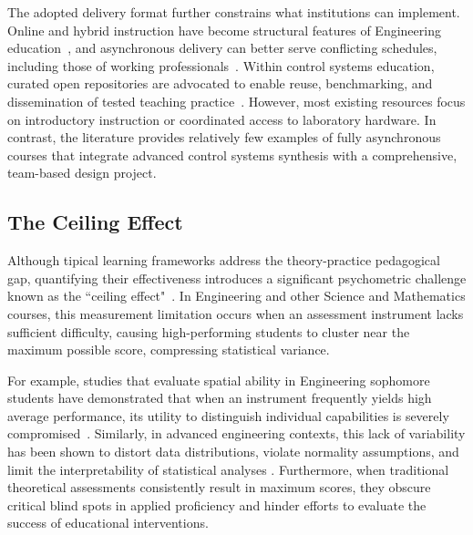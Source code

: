 \documentclass[journal]{IEEEtran}
\begin{document}
The adopted delivery format further constrains what institutions can implement. Online and hybrid instruction have become structural features of Engineering education~\cite{chaconvasquez2024digitalControlEducation,quanser2021yorkhybridlab,quanser2022calgaryhybridlearning,quanser2022bitpblcontrols,mohammadi2025stralsundhybridlabs,mohammadi2025epflremotelabs}, and asynchronous delivery can better serve conflicting schedules, including those of working professionals~\cite{buiu2008,chaconvasquez2024digitalControlEducation}. Within control systems education, curated open repositories are advocated to enable reuse, benchmarking, and dissemination of tested teaching practice~\cite{serbezov2022openAccessResourcesFeedbackDynamicsControl}. However, most existing resources focus on introductory instruction or coordinated access to laboratory hardware. In contrast, the literature provides relatively few examples of fully asynchronous courses that integrate advanced control systems synthesis with a comprehensive, team-based design project.

\subsection{The Ceiling Effect}

Although tipical learning frameworks address the  theory-practice pedagogical gap, quantifying their effectiveness introduces a significant psychometric challenge known as the ``ceiling effect"~\cite{Wang2009, Uttl2005, edwards2024, gilbert2025, Call2016, Bahnson2023, Staus2021}. In Engineering and other Science and Mathematics courses, this measurement limitation occurs when an assessment instrument lacks sufficient difficulty, causing high-performing students to cluster near the maximum possible score, compressing statistical variance. 

For example, studies that evaluate spatial ability in Engineering sophomore students have demonstrated that when an instrument frequently yields high average performance, its utility to distinguish individual capabilities is severely compromised~\cite{Call2016}. Similarly, in advanced engineering contexts, this lack of variability has been shown to distort data distributions, violate normality assumptions, and limit the interpretability of statistical analyses \cite{Bahnson2023}. 
%
Furthermore, when traditional theoretical assessments consistently result in maximum scores, they obscure critical blind spots in applied proficiency and hinder efforts to evaluate the success of educational interventions.
\end{document}
